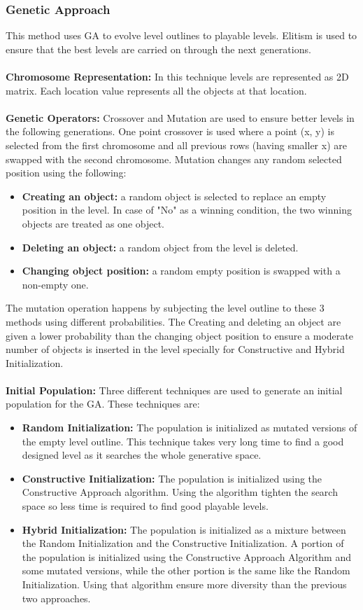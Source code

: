 \subsubsection{Genetic Approach}
This method uses GA to evolve level outlines to playable levels. Elitism is used to ensure that the best levels are carried on through the next generations.\\\\
\textbf{Chromosome Representation:} In this technique levels are represented as 2D matrix. Each location value represents all the objects at that location.\\\\
\textbf{Genetic Operators:} Crossover and Mutation are used to ensure better levels in the following generations. One point crossover is used where a point (x, y) is selected from the first chromosome and all previous rows (having smaller x) are swapped with the second chromosome. Mutation changes any random selected position using the following:
\begin{itemize} \itemsep0pt \parskip0pt 
	\item \textbf{Creating an object:} a random object is selected to replace an empty position in the level. In case of "No" as a winning condition, the two winning objects are treated as one object.
	\item \textbf{Deleting an object:} a random object from the level is deleted.
	\item \textbf{Changing object position:} a random empty position is swapped with a non-empty one.
\end{itemize}
The mutation operation happens by subjecting the level outline to these 3 methods using different probabilities. The Creating and deleting an object are given a lower probability than the changing object position to ensure a moderate number of objects is inserted in the level specially for Constructive and Hybrid Initialization.\\\\
\textbf{Initial Population:} Three different techniques are used to generate an initial population for the GA. These techniques are:
\begin{itemize} \itemsep0pt \parskip0pt 
	\item \textbf{Random Initialization:} The population is initialized as mutated versions of the empty level outline. This technique takes very long time to find a good designed level as it searches the whole generative space.
	\item \textbf{Constructive Initialization:} The population is initialized using the Constructive Approach algorithm. Using the algorithm tighten the search space so less time is required to find good playable levels.
	\item \textbf{Hybrid Initialization:} The population is initialized as a mixture between the Random Initialization and the Constructive Initialization. A portion of the population is initialized using the Constructive Approach Algorithm and some mutated versions, while the other portion is the same like the Random Initialization. Using that algorithm ensure more diversity than the previous two approaches.
\end{itemize}
